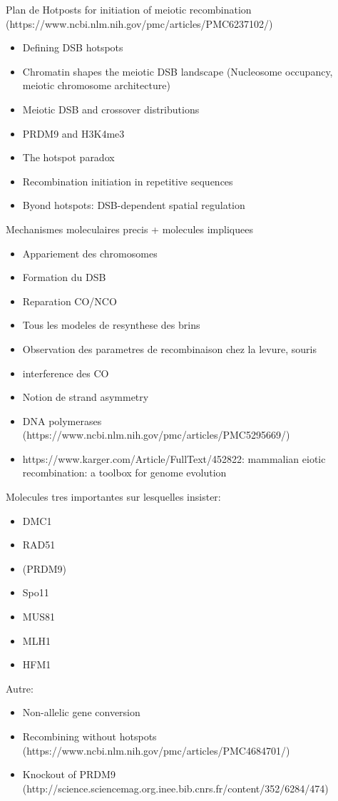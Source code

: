 Plan de Hotposts for initiation of meiotic recombination (https://www.ncbi.nlm.nih.gov/pmc/articles/PMC6237102/)
\begin{itemize}
	\item Defining DSB hotspots
	\item Chromatin shapes the meiotic DSB landscape (Nucleosome occupancy, meiotic chromosome architecture)
	\item Meiotic DSB and crossover distributions
	\item PRDM9 and H3K4me3
	\item The hotspot paradox
	\item Recombination initiation in repetitive sequences
	\item Byond hotspots: DSB-dependent spatial regulation


\end{itemize}


Mechanismes moleculaires precis + molecules impliquees
\begin{itemize}
	\item Appariement des chromosomes
	\item Formation du DSB
	\item Reparation CO/NCO
	\item Tous les modeles de resynthese des brins
	\item Observation des parametres de recombinaison chez la levure, souris
	\item interference des CO
	\item Notion de strand asymmetry
	\item DNA polymerases (https://www.ncbi.nlm.nih.gov/pmc/articles/PMC5295669/)
	\item https://www.karger.com/Article/FullText/452822: mammalian eiotic recombination: a toolbox for genome evolution

\end{itemize}


Molecules tres importantes sur lesquelles insister:
\begin{itemize}
	\item DMC1
	\item RAD51
	\item (PRDM9)
	\item Spo11
	\item MUS81
	\item MLH1
	\item HFM1
\end{itemize}

Autre:
\begin{itemize}
	\item Non-allelic gene conversion
	\item Recombining without hotspots (https://www.ncbi.nlm.nih.gov/pmc/articles/PMC4684701/)
	\item Knockout of PRDM9 (http://science.sciencemag.org.inee.bib.cnrs.fr/content/352/6284/474)

\end{itemize}




